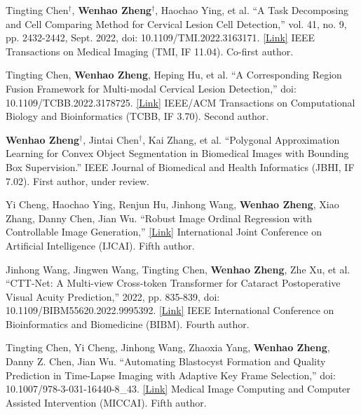 
\begin{cventries}

    \cventry
    {Tingting Chen$^\dagger$, \textbf{Wenhao Zheng$^\dagger$}, Haochao Ying, et al. ``A Task Decomposing and Cell Comparing Method for Cervical Lesion Cell Detection,'' vol. 41, no. 9, pp. 2432-2442, Sept. 2022, doi: 10.1109/TMI.2022.3163171. \href{https://ieeexplore.ieee.org/document/9744114}{\textcolor{link}{[Link]}}}
    {IEEE Transactions on Medical Imaging (TMI, IF 11.04). Co-first author.}
    {\ } %
    {} %
    {}

    \cventry
    {Tingting Chen, \textbf{Wenhao Zheng}, Heping Hu, et al. ``A Corresponding Region Fusion Framework for Multi-modal Cervical Lesion Detection,'' doi: 10.1109/TCBB.2022.3178725. \href{https://ieeexplore.ieee.org/document/9784879}{\textcolor{link}{[Link]}}}
    {IEEE/ACM Transactions on Computational Biology and Bioinformatics (TCBB, IF 3.70). Second author.}
    {\ } %
    {} %
    {}

    \cventry
    {\textbf{Wenhao Zheng$^\dagger$}, Jintai Chen$^\dagger$, Kai Zhang, et al. ``Polygonal Approximation Learning for Convex Object Segmentation in Biomedical Images with Bounding Box Supervision.''}
    {IEEE Journal of Biomedical and Health Informatics (JBHI, IF 7.02). First author, under review.}
    {\ } %
    {} %
    {}

    \cventry
    {Yi Cheng, Haochao Ying, Renjun Hu, Jinhong Wang, \textbf{Wenhao Zheng}, Xiao Zhang, Danny Chen, Jian Wu. ``Robust Image Ordinal Regression with Controllable Image Generation,'' \href{https://arxiv.org/abs/2305.04213}{\textcolor{link}{[Link]}}}
    {International Joint Conference on Artificial Intelligence (IJCAI). Fifth author.}
    {\ } %
    {} %
    {}

    \cventry
    {Jinhong Wang, Jingwen Wang, Tingting Chen, \textbf{Wenhao Zheng}, Zhe Xu, et al. ``CTT-Net: A Multi-view Cross-token Transformer for Cataract Postoperative Visual Acuity Prediction,'' 2022, pp. 835-839, doi: 10.1109/BIBM55620.2022.9995392. \href{https://ieeexplore.ieee.org/document/9995392}{\textcolor{link}{[Link]}}}
    {IEEE International Conference on Bioinformatics and Biomedicine (BIBM). Fourth author.}
    {\ } %
    {} %
    {}

    \cventry
    {Tingting Chen, Yi Cheng, Jinhong Wang, Zhaoxia Yang, \textbf{Wenhao Zheng}, Danny Z. Chen, Jian Wu. ``Automating Blastocyst Formation and Quality Prediction in Time-Lapse Imaging with Adaptive Key Frame Selection,'' doi: 10.1007/978-3-031-16440-8\_43. \href{https://link.springer.com/chapter/10.1007/978-3-031-16440-8_43}{\textcolor{link}{[Link]}}}
    {Medical Image Computing and Computer Assisted Intervention (MICCAI). Fifth author.}
    {\ } %
    {} %
    {}
\end{cventries}
